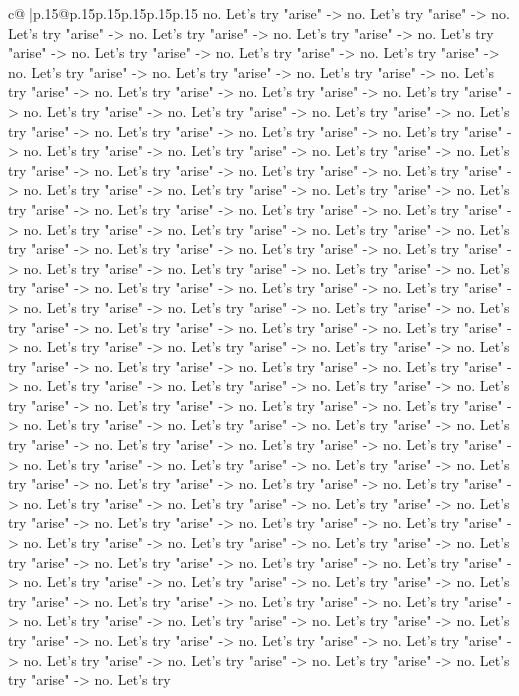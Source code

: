 \documentclass{article}
\begin{document}
{\begin{supertabular}{c@{$\;$}|p{.15\linewidth}@{}p{.15\linewidth}p{.15\linewidth}p{.15\linewidth}p{.15\linewidth}p{.15\linewidth}}
{{{no. Let's try "arise" {-}> no. Let's try "arise" {-}> no. Let's try "arise" {-}> no. Let's try "arise" {-}> no. Let's try "arise" {-}> no. Let's try "arise" {-}> no. Let's try "arise" {-}> no. Let's try "arise" {-}> no. Let's try "arise" {-}> no. Let's try "arise" {-}> no. Let's try "arise" {-}> no. Let's try "arise" {-}> no. Let's try "arise" {-}> no. Let's try "arise" {-}> no. Let's try "arise" {-}> no. Let's try "arise" {-}> no. Let's try "arise" {-}> no. Let's try "arise" {-}> no. Let's try "arise" {-}> no. Let's try "arise" {-}> no. Let's try "arise" {-}> no. Let's try "arise" {-}> no. Let's try "arise" {-}> no. Let's try "arise" {-}> no. Let's try "arise" {-}> no. Let's try "arise" {-}> no. Let's try "arise" {-}> no. Let's try "arise" {-}> no. Let's try "arise" {-}> no. Let's try "arise" {-}> no. Let's try "arise" {-}> no. Let's try "arise" {-}> no. Let's try "arise" {-}> no. Let's try "arise" {-}> no. Let's try "arise" {-}> no. Let's try "arise" {-}> no. Let's try "arise" {-}> no. Let's try "arise" {-}> no. Let's try "arise" {-}> no. Let's try "arise" {-}> no. Let's try "arise" {-}> no. Let's try "arise" {-}> no. Let's try "arise" {-}> no. Let's try "arise" {-}> no. Let's try "arise" {-}> no. Let's try "arise" {-}> no. Let's try "arise" {-}> no. Let's try "arise" {-}> no. Let's try "arise" {-}> no. Let's try "arise" {-}> no. Let's try "arise" {-}> no. Let's try "arise" {-}> no. Let's try "arise" {-}> no. Let's try "arise" {-}> no. Let's try "arise" {-}> no. Let's try "arise" {-}> no. Let's try "arise" {-}> no. Let's try "arise" {-}> no. Let's try "arise" {-}> no. Let's try "arise" {-}> no. Let's try "arise" {-}> no. Let's try "arise" {-}> no. Let's try "arise" {-}> no. Let's try "arise" {-}> no. Let's try "arise" {-}> no. Let's try "arise" {-}> no. Let's try "arise" {-}> no. Let's try "arise" {-}> no. Let's try "arise" {-}> no. Let's try "arise" {-}> no. Let's try "arise" {-}> no. Let's try "arise" {-}> no. Let's try "arise" {-}> no. Let's try "arise" {-}> no. Let's try "arise" {-}> no. Let's try "arise" {-}> no. Let's try "arise" {-}> no. Let's try "arise" {-}> no. Let's try "arise" {-}> no. Let's try "arise" {-}> no. Let's try "arise" {-}> no. Let's try "arise" {-}> no. Let's try "arise" {-}> no. Let's try "arise" {-}> no. Let's try "arise" {-}> no. Let's try "arise" {-}> no. Let's try "arise" {-}> no. Let's try "arise" {-}> no. Let's try "arise" {-}> no. Let's try "arise" {-}> no. Let's try "arise" {-}> no. Let's try "arise" {-}> no. Let's try "arise" {-}> no. Let's try "arise" {-}> no. Let's try "arise" {-}> no. Let's try "arise" {-}> no. Let's try "arise" {-}> no. Let's try "arise" {-}> no. Let's try "arise" {-}> no. Let's try "arise" {-}> no. Let's try "arise" {-}> no. Let's try "arise" {-}> no. Let's try "arise" {-}> no. Let's try "arise" {-}> no. Let's try "arise" {-}> no. Let's try "arise" {-}> no. Let's try "arise" {-}> no. Let's try "arise" {-}> no. Let's try "arise" {-}> no. Let's try "arise" {-}> no. Let's try "arise" {-}> no. Let's try "arise" {-}> no. Let's try "arise" {-}> no. Let's try "arise" {-}> no. Let's try "arise" {-}> no. Let's try "arise" {-}> no. Let's try "arise" {-}> no. Let's try "arise" {-}> no. Let's try }}}
\end{supertabular}}
\end{document}
